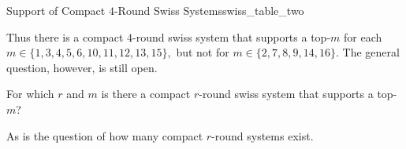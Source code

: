 {    \begin{figg}{Support of Compact $4$-Round Swiss Systems}{swiss_table_two}
        \begin{center}
        \end{center}
    \end{figg}

    Thus there is a compact $4$-round swiss system that supports a top-$m$ for each $m \in \{1, 3, 4, 5, 6, 10, 11, 12, 13, 15\},$ but not for $m \in \{2, 7, 8, 9, 14, 16\}.$ The general question, however, is still open.

    \begin{oq}{}{}
        For which $r$ and $m$ is there a compact $r$-round swiss system that supports a top-$m$?
    \end{oq}

    As is the question of how many compact $r$-round systems exist.

}
